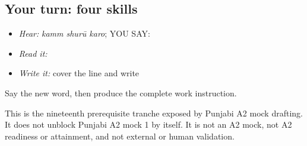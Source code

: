 \subsection*{Your turn: four skills}
\begin{itemize}
\raggedright
  \item \emph{Hear:} \emph{kamm shurū karo}; YOU SAY: \textbf{  }
  \item \emph{Read it:} \textbf{  }
  \item \emph{Write it:} cover the line and write \textbf{  }
\end{itemize}

\begin{tcolorbox}[breakable,colback=teal!4,colframe=teal!35!black,title={Before you move on}]
Say the new word, then produce the complete work instruction.

This is the nineteenth prerequisite tranche exposed by Punjabi A2 mock drafting. It does not unblock Punjabi A2 mock 1 by itself. It is not an A2 mock, not A2 readiness or attainment, and not external or human validation.
\end{tcolorbox}
